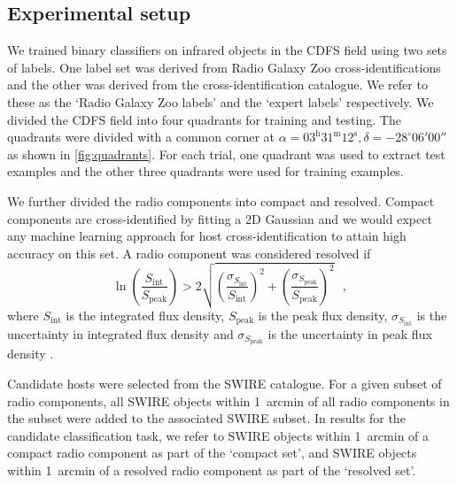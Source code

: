   \subsection{Experimental setup}
  \label{sec:atlas-xid-experimental-setup}

    We trained binary classifiers on infrared objects in the CDFS field using
    two sets of labels. One label set was derived from Radio Galaxy Zoo
    cross-identifications and the other was derived from the \citet{norris06}
    cross-identification catalogue. We refer to these as the `Radio Galaxy Zoo
    labels' and the `expert labels' respectively. We divided the CDFS field
    into four quadrants for training and testing. The quadrants were divided
    with a common corner at $\alpha = 03^\text{h}31^\text{m}12^\text{s},
    \delta = -28^\circ{}06'00''$ as shown in \autoref{fig:quadrants}. For
    each trial, one quadrant was used to extract test examples and the other
    three quadrants were used for training examples.

    We further divided the radio components into compact and resolved. Compact
    components are cross-identified by fitting a 2D Gaussian \citep[as
    in][]{norris06} and we would expect any machine learning approach for host
    cross-identification to attain high accuracy on this set. A radio component was
    considered resolved if
    \begin{equation}
      \label{eq:atlas-compact}
        \ln \left(
          \frac{S_{\text{int}}}
               {S_{\text{peak}}}
        \right) > 2\sqrt{\left(
          \frac{\sigma_{S_{\text{int}}}}
               {S_{\text{int}}}
        \right)^2 + \left(
          \frac{\sigma_{S_{\text{peak}}}}
               {S_{\text{peak}}}
        \right)^2}\,\,\,\,,
    \end{equation}%
    where \(S_{\text{int}}\) is the integrated flux density,
    \(S_{\text{peak}}\) is the peak flux density, {$\sigma_{S_{\text{int}}}$ is
    the uncertainty in integrated flux density and $\sigma_{S_{\text{peak}}}$
    is the uncertainty in peak flux density} \citep[following][]{franzen15}.

    Candidate hosts were selected from the SWIRE catalogue. For a given subset
    of radio components, all SWIRE objects within 1~arcmin of all radio
    components in the subset were added to the associated SWIRE subset. In results
    for the candidate classification task, we refer to SWIRE objects
    within 1~arcmin of a compact radio component as part of the `compact set',
    and SWIRE objects within 1~arcmin of a resolved radio component as part of
    the `resolved set'.

